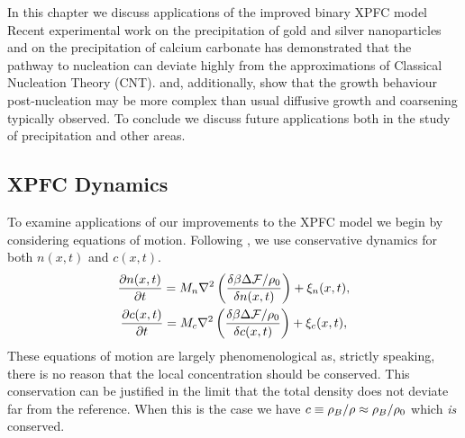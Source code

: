 \label{chapter:applications}

In this chapter we discuss applications of the improved binary XPFC
model   Recent experimental work on the precipitation of
gold and silver nanoparticles\cite{LOH17} and on the precipitation of calcium
carbonate \cite{WALLACE13} has demonstrated that the pathway to nucleation can
deviate highly from the approximations of Classical Nucleation Theory (CNT).  and, additionally, show that the 
growth behaviour post-nucleation may be more complex than usual diffusive growth 
and coarsening typically observed. To conclude we discuss future applications both in the
study of precipitation and other areas.

\subsection{XPFC Dynamics} %

To examine applications of our improvements to the XPFC model we begin by
considering equations of motion. Following \cite{GREENWOOD11_BINARY}, we use
conservative dynamics for both $n(x, t)$ and $c(x, t)$.
%
\begin{gather}
    \frac{\partial n(x, t)}{\partial t} = 
        M_n \nabla^2\left(\frac{\delta \beta \Delta\mathcal{F} / \rho_0}{\delta n(x, t)}\right) 
        + \xi_n(x, t), \\ 
    \frac{\partial c(x, t)}{\partial t} = 
        M_c \nabla^2\left(\frac{\delta \beta \Delta \mathcal{F} / \rho_0}{\delta c(x, t)}\right)
        + \xi_c(x, t),
\end{gather}
%
 These equations of motion are largely phenomenological as, strictly speaking,
there is no reason that the local concentration should be conserved.  This
conservation can be justified in the limit that the total density does not
deviate far from the reference. When this is the case we have $c \equiv \rho_B /
\rho \approx \rho_B / \rho_0$ which \textit{is} conserved. 

